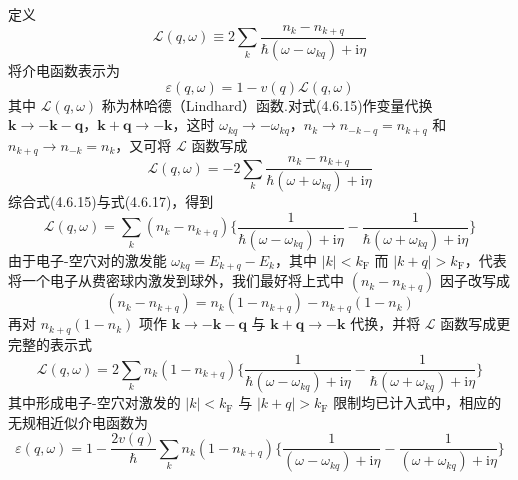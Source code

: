 定义
\begin{equation}
  \mathcal{L}(q,\omega)\equiv 2\sum_{k}
  \frac{n_{k}-n_{k+q}}{\hbar\left(\omega-\omega_{kq}\right)+\mathrm{i}\eta}
\end{equation}
将介电函数表示为
\begin{equation}
  \varepsilon(q,\omega)=1-v(q)\mathcal{L}(q,\omega)
\end{equation}
其中 $\mathcal{L}(q,\omega)$ 称为林哈德（Lindhard）函数.对式(4.6.15)作变量代换 $\boldsymbol{k}\to-\boldsymbol{k}-\boldsymbol{q}$，$\boldsymbol{k}+\boldsymbol{q}\to-\boldsymbol{k}$，这时 $\omega_{kq}\to-\omega_{kq}$，$n_{k}\to n_{-k-q}=n_{k+q}$ 和 $n_{k+q}\to n_{-k}=n_{k}$，又可将 $\mathcal{L}$ 函数写成
\begin{equation}
  \mathcal{L}(q,\omega)=-2\sum_{k}
  \frac{n_{k}-n_{k+q}}{\hbar\left(\omega+\omega_{kq}\right)+\mathrm{i}\eta}
\end{equation}
综合式(4.6.15)与式(4.6.17)，得到
\begin{equation}
  \mathcal{L}(q,\omega)=\sum_{k}\left(n_{k}-n_{k+q}\right)
  \bigg\{\frac{1}{\hbar\left(\omega-\omega_{kq}\right)+\mathrm{i}\eta}
  -\frac{1}{\hbar\left(\omega+\omega_{kq}\right)+\mathrm{i}\eta}\bigg\}
\end{equation}
由于电子-空穴对的激发能 $\omega_{kq}=E_{k+q}-E_{k}$，其中 $|k|<k_{\mathrm{F}}$ 而 $|k+q|>k_{\mathrm{F}}$，代表将一个电子从费密球内激发到球外，我们最好将上式中 $\left(n_{k}-n_{k+q}\right)$ 因子改写成
\begin{equation}
  \left(n_{k}-n_{k+q}\right)=n_{k}\left(1-n_{k+q}\right)
  -n_{k+q}\left(1-n_{k}\right)
\end{equation}
再对 $n_{k+q}(1-n_{k})$ 项作 $\boldsymbol{k}\to-\boldsymbol{k}-\boldsymbol{q}$ 与 $\boldsymbol{k}+\boldsymbol{q}\to-\boldsymbol{k}$ 代换，并将 $\mathcal{L}$ 函数写成更完整的表示式
\begin{equation}
  \mathcal{L}(q,\omega)=2\sum_{k}n_{k}\left(1-n_{k+q}\right)
  \bigg\{\frac{1}{\hbar\left(\omega-\omega_{kq}\right)+\mathrm{i}\eta}
  -\frac{1}{\hbar\left(\omega+\omega_{kq}\right)+\mathrm{i}\eta}\bigg\}
\end{equation}
其中形成电子-空穴对激发的 $|k|<k_{\mathrm{F}}$ 与 $|k+q|>k_{\mathrm{F}}$ 限制均已计入式中，相应的无规相近似介电函数为
\begin{equation}
  \varepsilon(q,\omega)=1-\frac{2v(q)}{\hbar}\sum_{k}n_{k}\left(1-n_{k+q}\right)
  \bigg\{\frac{1}{\left(\omega-\omega_{kq}\right)+\mathrm{i}\eta}
  -\frac{1}{\left(\omega+\omega_{kq}\right)+\mathrm{i}\eta}\bigg\}
\end{equation}
